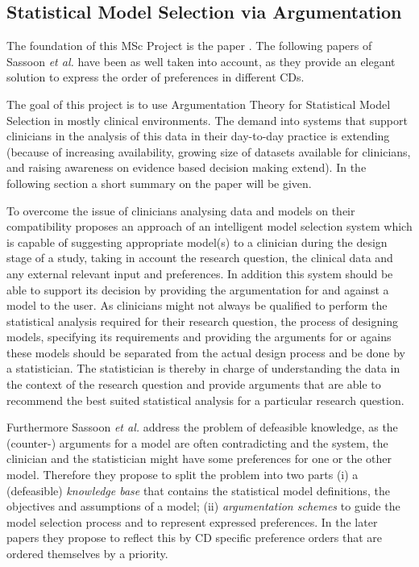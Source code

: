 \subsection{Statistical Model Selection via Argumentation}

\label{sub:statistical_model_selection}

The foundation of this MSc Project is the paper \cite{sassoon2014}. The following papers of Sassoon \textit{et al.} \cite{sassoon2016,sassoon2016CD} have been as well taken into account, as they provide an elegant solution to express the order of preferences in different \glspl{CD}.

The goal of this project is to use Argumentation Theory for Statistical Model Selection in mostly clinical environments. The demand into systems that support clinicians in the analysis of this data in their day-to-day practice is extending (because of increasing availability, growing size of datasets available for clinicians, and raising awareness on evidence based decision making extend). In the following section a short summary on the paper will be given. 

To overcome the issue of clinicians analysing data and models on their compatibility \cite{sassoon2014} proposes an approach of an intelligent model selection system which is capable of suggesting appropriate model(s) to a clinician during the design stage of a study, taking in account the research question, the clinical data and any external relevant input and preferences. In addition this system should be able to support its decision by providing the argumentation for and against a model to the user. As clinicians might not always be qualified to perform the statistical analysis required for their research question, the process of designing models, specifying its requirements and providing the arguments for or agains these models should be separated from the actual design process and be done by a statistician. The statistician is thereby in charge of understanding the data in the context of the research question and provide arguments that are able to recommend the best suited statistical analysis for a particular research question. 

Furthermore  Sassoon \textit{et al.} address the problem of defeasible knowledge, as the (counter-) arguments for a model are often contradicting and the system, the clinician and the statistician might have some preferences for one or the other model. Therefore they propose to split the problem into two parts (i) a (defeasible) \textit{knowledge base} that contains the statistical model definitions, the objectives and assumptions of a model; (ii) \textit{argumentation schemes} to guide the model selection process and to represent expressed preferences. In the later papers \cite{sassoon2016,sassoon2016CD} they propose to reflect this by \gls{CD} specific preference orders that are ordered themselves by a priority.

